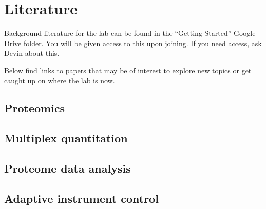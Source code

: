 \documentclass[
]{book}
\begin{document}
\hypertarget{literature}{%
\chapter{Literature}\label{literature}}

Background literature for the lab can be found in the ``Getting Started'' Google Drive folder. You will be given access to this upon joining. If you need access, ask Devin about this.

Below find links to papers that may be of interest to explore new topics or get caught up on where the lab is now.

\hypertarget{proteomics}{%
\section{Proteomics}\label{proteomics}}

\hypertarget{multiplex-quantitation}{%
\section{Multiplex quantitation}\label{multiplex-quantitation}}

\hypertarget{proteome-data-analysis}{%
\section{Proteome data analysis}\label{proteome-data-analysis}}

\hypertarget{adaptive-instrument-control}{%
\section{Adaptive instrument control}\label{adaptive-instrument-control}}

  
\end{document}
